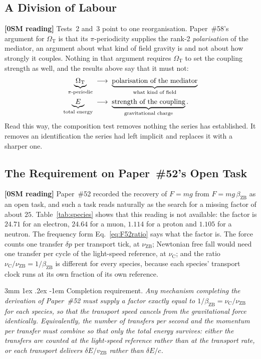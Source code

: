 \documentclass[%
 reprint, amsmath,amssymb, aps, prb, ]{revtex4-2}
\makeatletter
\numberwithin{equation}{section}
\renewcommand\paragraph{%
  \@startsection{paragraph}{4}{\z@}%
    {3mm \@plus 1ex \@minus .2ex}%
    {-1em}%
    {\normalfont\normalsize\itshape}}
\newcommand{\vZB}{v_{\text{ZB}}}
\newcommand{\betaZB}{\beta_{\text{ZB}}}
\newcommand{\nuZB}{\nu_{\text{ZB}}}
\newcommand{\nuC}{\nu_{\text{C}}}
\newcommand{\OmT}{\Omega_{\text{T}}}
\makeatother
\begin{document}
\subsection{A Division of Labour}
\label{subsec:division}

\textbf{[0SM reading]} Tests~2 and~3 point to one reorganisation. Paper~\#58's argument for $\OmT$ is that its $\pi$-periodicity supplies the rank-2 \emph{polarisation} of the mediator, an argument about what kind of field gravity is and not about how strongly it couples. Nothing in that argument requires $\OmT$ to set the coupling strength as well, and the results above say that it must not:
\begin{align}
\underbrace{\OmT}_{\text{$\pi$-periodic}}
&\;\longrightarrow\;
\underbrace{\text{polarisation of the mediator}}_{\text{what kind of field}}
\notag\\
\underbrace{E}_{\text{total energy}}
&\;\longrightarrow\;
\underbrace{\text{strength of the coupling}}_{\text{gravitational charge}} .
\label{eq:division}
\end{align}
Read this way, the composition test removes nothing the series has established. It removes an identification the series had left implicit and replaces it with a sharper one.

\subsection{The Requirement on Paper~\#52's Open Task}
\label{subsec:constraint}

\textbf{[0SM reading]} Paper~\#52 recorded the recovery of $F = mg$ from $F = mg\,\betaZB$ as an open task, and such a task reads naturally as the search for a missing factor of about $25$. Table~\ref{tab:species} shows that this reading is not available: the factor is $24.71$ for an electron, $24.64$ for a muon, $1.114$ for a proton and $1.105$ for a neutron. The frequency form Eq.~\eqref{eq:F52ratio} says what the factor is. The force counts one transfer $\delta p$ per transport tick, at $\nuZB$; Newtonian free fall would need one transfer per cycle of the light-speed reference, at $\nuC$; and the ratio $\nuC/\nuZB = 1/\betaZB$ is different for every species, because each species' transport clock runs at its own fraction of its own reference.

\paragraph{Completion requirement.} \emph{Any mechanism completing the derivation of Paper~\#52 must supply a factor exactly equal to $1/\betaZB = \nuC/\nuZB$ for each species, so that the transport speed cancels from the gravitational force identically. Equivalently, the number of transfers per second and the momentum per transfer must combine so that only the total energy survives: either the transfers are counted at the light-speed reference rather than at the transport rate, or each transport delivers $\delta E/\vZB$ rather than $\delta E/c$.}
\end{document}
